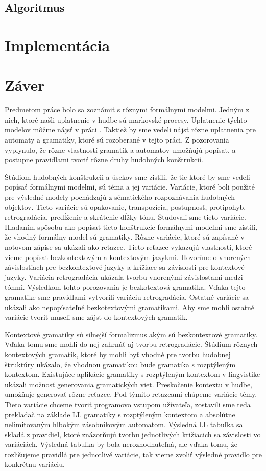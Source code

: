 \section{Algoritmus}

\chapter{Implementácia}
\label{chap:imp}
\chapter{Záver}
\label{chap:end}
Predmetom práce bolo sa zoznámiť s rôznymi formálnymi modelmi. Jedným z nich, ktoré našli uplatnenie v hudbe sú markovské procesy. Uplatnenie týchto modelov môžme nájsť v práci \cite{afrpub}. Taktiež by sme vedeli nájsť rôzne uplatnenia pre automaty a gramatiky, ktoré sú rozoberané v tejto práci. Z pozorovania vyplynulo, že rôzne vlastností gramatík a automatov umožňujú popísať, a postupne pravidlami tvoriť rôzne druhy hudobných konštrukcií. 

Štúdiom hudobných konštrukcii a úsekov sme zistili, že tie ktoré by sme vedeli popísať formálnymi modelmi, sú téma a jej variácie. Variácie, ktoré boli použité pre výsledné modely pochádzajú z sématického rozpoznávania hudobných objektov. Tieto variácie sú opakovanie, transpozícia, postupnosť, protipohyb, retrogradácia, predĺženie a skrátenie dĺžky tónu. Študovali sme tieto variácie. Hľadaním spôsobu ako popísať tieto konštrukcie formálnymi modelmi sme zistili, že vhodný formálny model sú gramatiky. Rôzne variácie, ktoré sú zapísané v notovom zápise sa ukázali ako reťazce. Tieto reťazce vykazujú vlastnosti, ktoré vieme popísať bezkontextovým a kontextovým jazykmi. Hovoríme o vnorených závislostiach pre bezkontextové jazyky a krížiace sa závislosti pre kontextové jazyky. Variácia retrogradácia ukázala tvorbu vnorenými závislosťami medzi tónmi. Výsledkom tohto porozovania je bezkotextová gramatika. Vďaka tejto gramatike sme pravidlami vytvorili variáciu retrogradácia. Ostatné variácie sa ukázali ako nepopísateľné bezkotextovými gramatikami. Aby sme mohli ostatné variácie tvoriť museli sme zájsť do kontextových gramatik.

Kontextové gramatiky sú silnejší formalizmus akým sú bezkontextové gramatiky. Vďaka tomu sme mohli do nej zahrnúť aj tvorbu retrogradácie. Štúdium rôznych kontextových gramatík, ktoré by mohli byť vhodné pre tvorbu hudobnej štruktúry ukázalo, že vhodnou gramatikou bude gramatika s rozptýleným kontextom. Existujúce aplikácie gramatiky s rozptýleným kontextom v lingvistike ukázali možnosť generovania gramatických viet. Preskočenie kontextu v hudbe, umožňuje generovať rôzne reťazce. Pod týmito reťazcami chápeme variácie témy. Tieto variácie chceme tvoriť programovo vstupom užívateľa, zostavili sme teda prekladač na základe LL gramatiky s rozptýleným kontextom a absolútne nelimitovaným hlbokým zásobníkovým automatom. Výsledná LL tabuľka sa skladá z pravidiel, ktoré znázorňujú tvorbu jednotlivých križiacich sa závislosti vo variáciách. Výsledná tabuľka by bola nerozhodnuteľná, ale vďaka tomu, že rozlišujeme pravidlá pre jednotlivé variácie, tak vieme zvoliť výsledné pravidlo pre konkrétnu variáciu.

